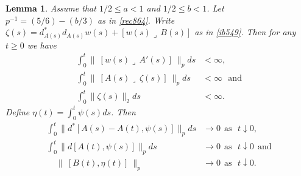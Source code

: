 \documentclass[12pt]{article}
\newtheorem{lemma}[theorem]{Lemma}
\def \eref{\eqref}
\def \lrc{\lrcorner\,}
\numberwithin{equation}{section}
\begin{document}
\begin{lemma}\label{lemrec30}  
 Assume that $1/2 \le a < 1$
 and $1/2 \le b < 1$. Let $ p^{-1} = (5/6) - (b/3)$ as in  \eref{rec864}. 
 Write $\zeta(s)= d_{A(s)}^* d_{A(s)} w(s) +[w(s)\lrc B(s)]$ as in \eref{ib549}.
 Then for any $t \ge0$ we have
 \begin{align}
 \int_0^t\|\ [w(s)\lrc A'(s)]\ \|_p  ds &< \infty,                  \label{rec870} \\
 \int_0^t \|\ [A(s)\lrc \zeta(s)]\ \|_p ds &< \infty   \ \ \ \text{and}            \label{rec871}\\
 \int_0^t \|\zeta(s)\|_2 ds &< \infty.                       \label{rec872}  
 \end{align}
 Define $\eta(t) = \int_0^t \psi(s)ds$. Then
 \begin{align}
\int_0^t \| d^*[A(s) - A(t), \psi(s)] \|_p ds &\rightarrow 0 \ \ \text{as}\ \ \ t\downarrow 0,    \label{rec929c} \\
\int_0^t \| d[A(t), \psi(s)] \|_p ds &\rightarrow 0   \ \   \text{as}\ \ \ t \downarrow 0\ \ \text{and}     \label{rec929d} \\
 \ \ \ \ \ \|\ [B(t), \eta(t)]\ \|_p &\rightarrow 0 \ \   \text{as}\ \ \ t \downarrow 0. \ \             \label{rec850c} 
\end{align}
 \end{lemma}
\end{document}
